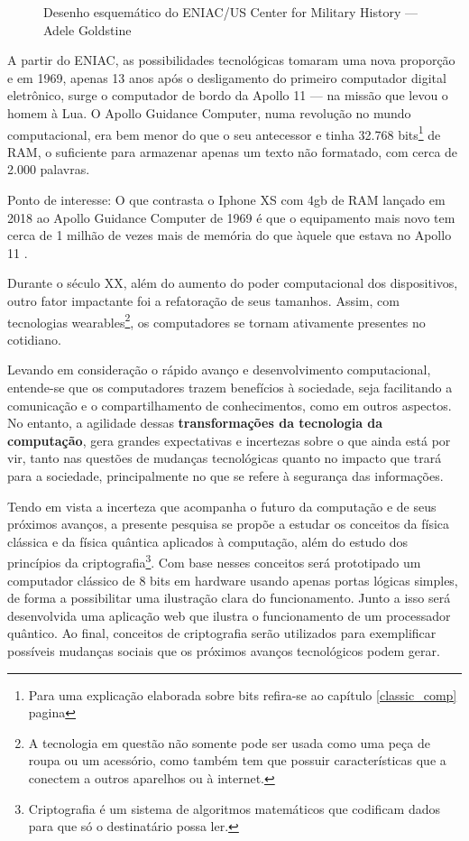 \vspace{1cm}
\begin{figure}[H] \centering 
  \caption{\label{ENIAC_floor_layout} Desenho esquemático do ENIAC/US Center for Military History — Adele Goldstine} 
\end{figure}

A partir do ENIAC, as possibilidades tecnológicas tomaram uma nova proporção e em 1969, apenas 13 anos após o desligamento do primeiro computador digital eletrônico, surge o computador de bordo da Apollo 11 — na missão que levou o homem à Lua. O Apollo Guidance Computer, numa revolução no mundo computacional, era bem menor do que o seu antecessor e tinha 32.768 bits\footnote{Para uma explicação elaborada sobre bits refira-se ao capítulo \ref{classic_comp} pagina \pageref{bits}} de RAM, o suficiente para armazenar apenas um texto não formatado, com cerca de 2.000 palavras.

Ponto de interesse: O que contrasta o Iphone XS com 4gb de RAM lançado em 2018 ao Apollo Guidance Computer de 1969 é que o equipamento mais novo tem cerca de 1 milhão de vezes  mais de memória do que àquele que estava no Apollo 11 \cite{5}.

Durante o século XX, além do aumento do poder computacional dos dispositivos, outro fator impactante foi a refatoração de seus tamanhos. Assim, com tecnologias wearables\footnote{A tecnologia em questão não somente pode ser usada como uma peça de roupa ou um acessório, como também tem que possuir características que a conectem a outros aparelhos ou à internet.}, os computadores se tornam ativamente presentes no cotidiano. 

Levando em consideração o rápido avanço e desenvolvimento computacional, entende-se que os computadores trazem benefícios à sociedade, seja facilitando a comunicação e o compartilhamento de conhecimentos, como em outros aspectos. No entanto, a agilidade dessas \textbf{transformações da tecnologia da computação}, gera grandes expectativas e incertezas sobre o que ainda está por vir, tanto nas questões de mudanças tecnológicas quanto no impacto que trará para a sociedade, principalmente no que se refere à segurança das informações. 

Tendo em vista a incerteza que acompanha o futuro da computação e de seus próximos avanços, a presente pesquisa se propõe a estudar os conceitos da física clássica e da física quântica aplicados à computação, além do estudo dos princípios da criptografia\footnote{Criptografia é um sistema de algoritmos matemáticos que codificam dados para que só o destinatário possa ler.}. Com base nesses conceitos será prototipado um computador clássico de 8 bits em hardware usando apenas portas lógicas simples, de forma a possibilitar uma ilustração clara do funcionamento. Junto a isso será desenvolvida uma aplicação web que ilustra o funcionamento de um processador quântico. Ao final, conceitos de criptografia serão utilizados para exemplificar possíveis mudanças sociais que os próximos avanços tecnológicos podem gerar.

